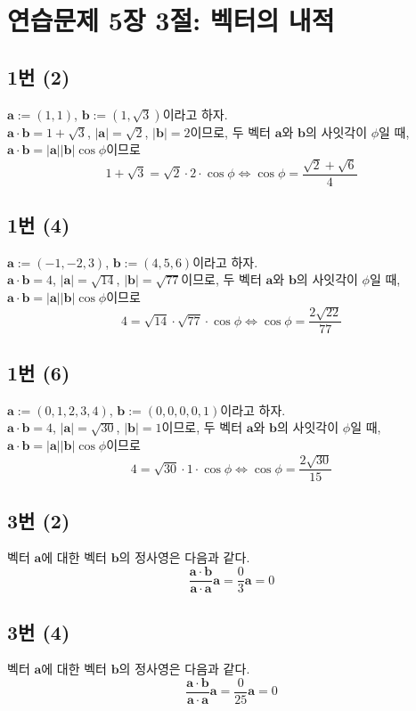 \section{연습문제 5장 3절: 벡터의 내적}
\subsection{1번 (2)}
$\mathbf{a}:=(1,1)$, $\mathbf{b}:=(1,\sqrt{3})$이라고 하자.\\[1\baselineskip]
$\mathbf{a}\cdot\mathbf{b}=1+\sqrt{3}$, $|\mathbf{a}|=\sqrt{2}$, $|\mathbf{b}|=2$이므로, 두 벡터 $\mathbf{a}$와 $\mathbf{b}$의 사잇각이 $\phi$일 때, $\mathbf{a}\cdot\mathbf{b}=|\mathbf{a}||\mathbf{b}|\cos\phi$이므로
\[
1+\sqrt{3}=\sqrt{2}\cdot2\cdot\cos\phi \Longleftrightarrow \cos\phi=\frac{\sqrt{2}+\sqrt{6}}{4}
\]

\subsection{1번 (4)}
$\mathbf{a}:=(-1,-2,3)$, $\mathbf{b}:=(4,5,6)$이라고 하자.\\[1\baselineskip]
$\mathbf{a}\cdot\mathbf{b}=4$, $|\mathbf{a}|=\sqrt{14}$, $|\mathbf{b}|=\sqrt{77}$이므로, 두 벡터 $\mathbf{a}$와 $\mathbf{b}$의 사잇각이 $\phi$일 때, $\mathbf{a}\cdot\mathbf{b}=|\mathbf{a}||\mathbf{b}|\cos\phi$이므로
\[
4=\sqrt{14}\cdot\sqrt{77}\cdot\cos\phi \Longleftrightarrow \cos\phi=\frac{2\sqrt{22}}{77}
\]

\subsection{1번 (6)}
$\mathbf{a}:=(0,1,2,3,4)$, $\mathbf{b}:=(0,0,0,0,1)$이라고 하자.\\[1\baselineskip]
$\mathbf{a}\cdot\mathbf{b}=4$, $|\mathbf{a}|=\sqrt{30}$, $|\mathbf{b}|=1$이므로, 두 벡터 $\mathbf{a}$와 $\mathbf{b}$의 사잇각이 $\phi$일 때, $\mathbf{a}\cdot\mathbf{b}=|\mathbf{a}||\mathbf{b}|\cos\phi$이므로
\[
4=\sqrt{30}\cdot1\cdot\cos\phi \Longleftrightarrow \cos\phi=\frac{2\sqrt{30}}{15}
\]

\subsection{3번 (2)}
벡터 $\mathbf{a}$에 대한 벡터 $\mathbf{b}$의 정사영은 다음과 같다.
\[
\frac{\mathbf{a}\cdot\mathbf{b}}{\mathbf{a}\cdot\mathbf{a}}\mathbf{a}=\frac{0}{3}\mathbf{a}=0
\]

\subsection{3번 (4)}
벡터 $\mathbf{a}$에 대한 벡터 $\mathbf{b}$의 정사영은 다음과 같다.
\[
\frac{\mathbf{a}\cdot\mathbf{b}}{\mathbf{a}\cdot\mathbf{a}}\mathbf{a}=\frac{0}{25}\mathbf{a}=0
\]

